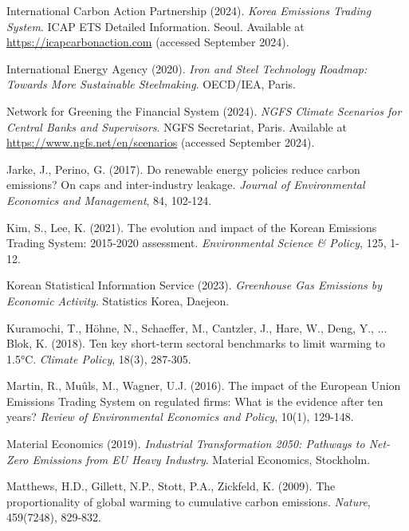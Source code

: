 \documentclass[preprint,1p,authoryear]{elsarticle}
\begin{document}
\begin{thebibliography}{99}
 International Carbon Action Partnership (2024). \textit{Korea Emissions Trading System}. ICAP ETS Detailed Information. Seoul. Available at \url{https://icapcarbonaction.com} (accessed September 2024).

 International Energy Agency (2020). \textit{Iron and Steel Technology Roadmap: Towards More Sustainable Steelmaking}. OECD/IEA, Paris.

 Network for Greening the Financial System (2024). \textit{NGFS Climate Scenarios for Central Banks and Supervisors}. NGFS Secretariat, Paris. Available at \url{https://www.ngfs.net/en/scenarios} (accessed September 2024).

 Jarke, J., Perino, G. (2017). Do renewable energy policies reduce carbon emissions? On caps and inter-industry leakage. \textit{Journal of Environmental Economics and Management}, 84, 102-124.

 Kim, S., Lee, K. (2021). The evolution and impact of the Korean Emissions Trading System: 2015-2020 assessment. \textit{Environmental Science \& Policy}, 125, 1-12.

 Korean Statistical Information Service (2023). \textit{Greenhouse Gas Emissions by Economic Activity}. Statistics Korea, Daejeon.

 Kuramochi, T., H{\"o}hne, N., Schaeffer, M., Cantzler, J., Hare, W., Deng, Y., ... Blok, K. (2018). Ten key short-term sectoral benchmarks to limit warming to 1.5°C. \textit{Climate Policy}, 18(3), 287-305.

 Martin, R., Muûls, M., Wagner, U.J. (2016). The impact of the European Union Emissions Trading System on regulated firms: What is the evidence after ten years? \textit{Review of Environmental Economics and Policy}, 10(1), 129-148.

 Material Economics (2019). \textit{Industrial Transformation 2050: Pathways to Net-Zero Emissions from EU Heavy Industry}. Material Economics, Stockholm.

 Matthews, H.D., Gillett, N.P., Stott, P.A., Zickfeld, K. (2009). The proportionality of global warming to cumulative carbon emissions. \textit{Nature}, 459(7248), 829-832.


\end{thebibliography}
\end{document}
